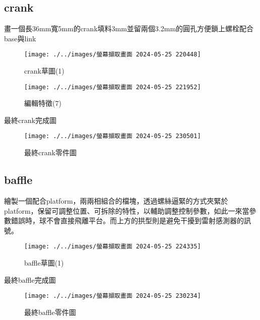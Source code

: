 \newpage

\subsection{crank}

畫一個長36mm寬5mm的crank填料3mm並留兩個3.2mm的圓孔方便鎖上螺栓配合base與link


\begin{figure}[h!]
    \centering
    \begin{minipage}[b]{0.6\textwidth}
        \centering
        \texttt{[image: ./../images/螢幕擷取畫面 2024-05-25 220448]}
        \caption{crank草圖(1)}
    \end{minipage}
    \hfill
    \begin{minipage}[b]{0.35\textwidth}
        \centering
        \texttt{[image: ./../images/螢幕擷取畫面 2024-05-25 221952]} 
        \caption{編輯特徵(7)}
    \end{minipage}
\end{figure}

最終crank完成圖

\begin{figure}[htbp]
    \centering
    \texttt{[image: ./../images/螢幕擷取畫面 2024-05-25 230501]}
    \caption{最終crank零件圖}
\end{figure}

\newpage

\subsection{baffle}

繪製一個配合platform，兩兩相組合的檔塊，透過螺絲逼緊的方式夾緊於platform，保留可調整位置、可拆除的特性，以輔助調整控制參數，如此一來當參數錯誤時，球不會直接飛離平台。而上方的拱型則是避免干擾到雷射感測器的訊號。

\begin{figure}[htbp]
    \centering
    \texttt{[image: ./../images/螢幕擷取畫面 2024-05-25 224335]}
    \caption{baffle草圖(1)}
\end{figure}

最終baffle完成圖

\begin{figure}[htbp]
    \centering
    \texttt{[image: ./../images/螢幕擷取畫面 2024-05-25 230234]}
    \caption{最終baffle零件圖}
\end{figure}


